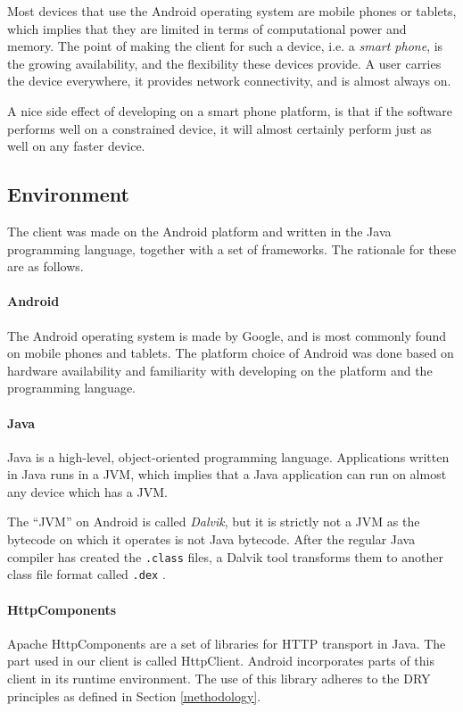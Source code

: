 \documentclass[pdftex,english,10pt,b5paper,twoside]{book}
\begin{document}
Most devices that use the Android operating system are mobile phones or
tablets, which implies that they are limited in terms of computational power
and memory. The point of making the client for such a device, i.e. a
\emph{smart phone}, is the growing availability, and the flexibility these
devices provide. A user carries the device everywhere, it provides network
connectivity, and is almost always on.

A nice side effect of developing on a smart phone platform, is that if the
software performs well on a constrained device, it will almost certainly
perform just as well on any faster device.

\subsection{Environment}

The client was made on the Android platform and written in the Java programming
language, together with a set of frameworks. The rationale for these are as
follows.

\paragraph{Android} The Android operating system is made by Google, and is most
commonly found on mobile phones and tablets. The platform choice of Android was
done based on hardware availability and familiarity with developing on the
platform and the programming language.

\paragraph{Java} Java is a high-level, object-oriented programming language.
Applications written in Java runs in a \ac{JVM}, which implies that a Java
application can run on almost any device which has a \ac{JVM}.

The ``\ac{JVM}'' on Android is called \emph{Dalvik}, but it is strictly not a
\acl{JVM} as the bytecode on which it operates is not Java bytecode.
After the regular Java compiler has created the \texttt{.class} files, a Dalvik
tool transforms them to another class file format called \texttt{.dex}
\cite{dalvik}.

\paragraph{HttpComponents} Apache HttpComponents are a set of libraries for
\ac{HTTP} transport in Java. The part used in our client is called HttpClient.
Android incorporates parts of this client in its runtime environment. The use
of this library adheres to the \ac{DRY} principles as defined in Section
\ref{methodology}.
\end{document}
